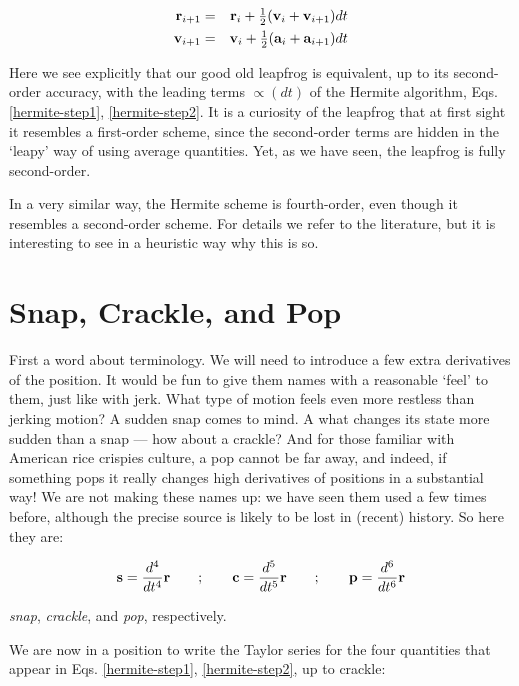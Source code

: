 \begin{eqnarray}
\br_{i+1} & = & \br_i + \half(\bv_i + \bv_{i+1})dt \label{leapfrog-step1b} \\
\bv_{i+1} & = & \bv_i + \half(\ba_i + \ba_{i+1})dt \label{leapfrog-step2b}
\end{eqnarray}

Here we see explicitly that our good old leapfrog is equivalent, up to
its second-order accuracy, with the leading terms $\propto (dt)$ of
the Hermite algorithm, Eqs. \ref{hermite-step1}, \ref{hermite-step2}.
It is a curiosity of the leapfrog that at first sight it resembles a
first-order scheme, since the second-order terms are hidden in the
`leapy' way of using average quantities.  Yet, as we have seen, the
leapfrog is fully second-order.

In a very similar way, the Hermite scheme is fourth-order, even though
it resembles a second-order scheme.  For details we refer to the
literature, but it is interesting to see in a heuristic way why this
is so.

\section{Snap, Crackle, and Pop}

First a word about terminology.  We will need to introduce a few extra
derivatives of the position.  It would be fun to give them names with
a reasonable `feel' to them, just like with jerk.  What type of motion
feels even more restless than jerking motion?  A sudden snap comes to
mind.  A what changes its state more sudden than a snap --- how about
a crackle?  And for those familiar with American rice crispies culture,
a pop cannot be far away, and indeed, if something pops it really
changes high derivatives of positions in a substantial way!  We are
not making these names up: we have seen them used a few times before,
although the precise source is likely to be lost in (recent) history.
So here they are:

\begin{equation}
{\bf s} = \frac{d^4}{dt^4} {\bf r} \qquad ; \qquad
{\bf c} = \frac{d^5}{dt^5} {\bf r} \qquad ; \qquad
{\bf p} = \frac{d^6}{dt^6} {\bf r}
\end{equation}

\noindent
{\it snap}, {\it crackle}, and {\it pop}, respectively.

We are now in a position to write the Taylor series for the four
quantities that appear in Eqs. \ref{hermite-step1}, \ref{hermite-step2},
up to crackle:

